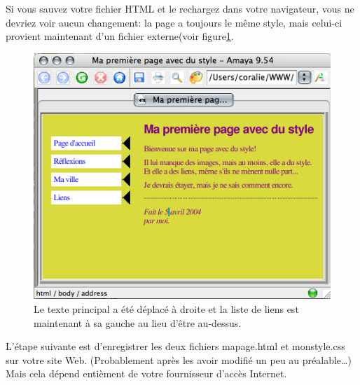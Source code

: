 Si vous sauvez votre fichier HTML et le rechargez dans votre navigateur, vous ne devriez voir aucun changement: la page a toujours le même style, mais celui-ci provient maintenant d'un fichier externe(voir figure\ref{fig:screen6}. 
\begin{figure}[t]
	\begin{center}
		\caption{Le texte principal a été déplacé à droite et la liste de liens est maintenant à sa gauche au lieu d'être au-dessus. }
		\label{fig:screen6}
		\includegraphics{voronin/img/capture5.png}	
	\end{center}
\end{figure}
L'étape suivante est d'enregistrer les deux fichiers mapage.html et monstyle.css sur votre site Web. (Probablement après les avoir modifié un peu au préalable…) Mais cela dépend entièment de votre fournisseur d'accès Internet. 





